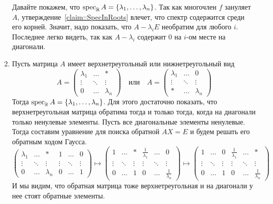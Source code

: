 \begin{enumerate}
Давайте покажем, что $\operatorname{spec}_\mathbb R A = \{\lambda_1,\ldots, \lambda_n\}$.
Так как многочлен $f$ зануляет $A$, утверждение~\ref{claim::SpecInRoots} влечет, что спектр содержится среди его корней.
Значит, надо показать, что $A-\lambda_i E$ необратим для любого $i$.
Последнее легко видеть, так как $A-\lambda_i$ содержит $0$ на $i$-ом месте на диагонали.

\item  Пусть матрица $A$ имеет верхнетреугольный или нижнетреугольный вид
\[
A = 
\begin{pmatrix}
{\lambda_1}&{\ldots}&{*}\\
{\vdots}&{\ddots}&{\vdots}\\
{0}&{\ldots}&{\lambda_n}
\end{pmatrix}
\quad
\text{или}
\quad
A = 
\begin{pmatrix}
{\lambda_1}&{\ldots}&{0}\\
{\vdots}&{\ddots}&{\vdots}\\
{*}&{\ldots}&{\lambda_n}
\end{pmatrix}
\]
Тогда $\operatorname{spec}_\mathbb RA = \{\lambda_1,\ldots, \lambda_n\}$.
Для этого достаточно показать, что верхнетреугольная матрица обратима тогда и только тогда, когда на диагонали только ненулевые элементы.
Пусть все диагональные элементы ненулевые.
Тогда составим уравнение для поиска обратной $AX = E$ и будем решать его обратным ходом Гаусса.
\[
\left(
\begin{array}{ccc|ccc}
{\lambda_1}&{\ldots}&{*}&{1}&{\ldots}&{0}\\
{\vdots}&{\ddots}&{\vdots}&{\vdots}&{\ddots}&{\vdots}\\
{0}&{\ldots}&{\lambda_n}&{0}&{\ldots}&{1}
\end{array}
\right)
\mapsto
\left(
\begin{array}{ccc|ccc}
{1}&{\ldots}&{*}&{\frac{1}{\lambda_1}}&{\ldots}&{0}\\
{\vdots}&{\ddots}&{\vdots}&{\vdots}&{\ddots}&{\vdots}\\
{0}&{\ldots}&{1}&{0}&{\ldots}&{\frac{1}{\lambda_n}}
\end{array}
\right)
\mapsto
\left(
\begin{array}{ccc|ccc}
{1}&{\ldots}&{0}&{\frac{1}{\lambda_1}}&{\ldots}&{*}\\
{\vdots}&{\ddots}&{\vdots}&{\vdots}&{\ddots}&{\vdots}\\
{0}&{\ldots}&{1}&{0}&{\ldots}&{\frac{1}{\lambda_n}}
\end{array}
\right)
\]
И мы видим, что обратная матрица тоже верхнетреугольная и на диагонали у нее стоят обратные элементы.


\end{enumerate}
